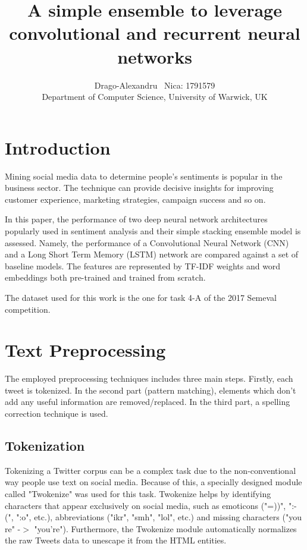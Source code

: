 \documentclass[10pt,conference,compsocconf]{IEEEtran}
\begin{document}
\title{A simple ensemble to leverage convolutional and recurrent neural networks}

\author{
  Drago-Alexandru ~Nica: 1791579\\
  Department of Computer Science, University of Warwick, UK
}

\maketitle

\section{Introduction}
\label{sec:introduction}

Mining social media data to determine people's sentiments is popular in the business sector. The technique can provide decisive insights for improving customer experience, marketing strategies, campaign success and so on. 

In this paper, the performance of two deep neural network architectures popularly used in sentiment analysis and their simple stacking ensemble model is assessed. Namely, the performance of a Convolutional Neural Network (CNN) and a Long Short Term Memory (LSTM) network are compared against a set of baseline models. The features are represented by TF-IDF weights and word embeddings both pre-trained and trained from scratch.

The dataset used for this work is the one for task 4-A of the 2017 Semeval competition.

\section{Text Preprocessing}
\label{sec:preprocessing}

The employed preprocessing techniques includes three main steps. Firstly, each tweet is tokenized. In the second part (pattern matching), elements which don't add any useful information are removed/replaced. In the third part, a spelling correction technique is used. 

\subsection{Tokenization} \label{subsec:tokenization}

Tokenizing a Twitter corpus can be a complex task due to the non-conventional way people use text on social media. Because of this, a specially designed module called "Twokenize" \cite{twokenize} was used for this task. Twokenize helps by identifying characters that appear exclusively on social media, such as emoticons ("=))", ":-(", ":o", etc.), abbreviations ("ikr", "smh", "lol", etc.) and missing characters ("you re" -$>$ "you're"). Furthermore, the Twokenize module automatically normalizes the raw Tweets data to unescape it from the HTML entities.
\end{document}
